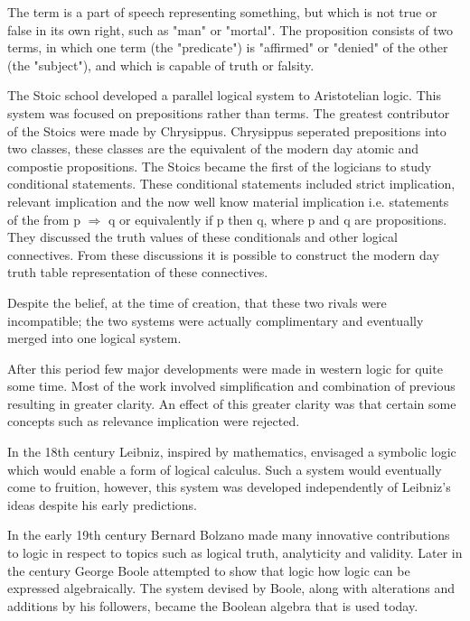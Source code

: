 The term is a part of speech representing something, but which is not true or false in its own right, such as "man" or "mortal".
The proposition consists of two terms, in which one term (the "predicate") is "affirmed" or "denied" of the other (the "subject"), and which is capable of truth or falsity.

The Stoic school developed a parallel logical system to Aristotelian logic. This system was focused on prepositions rather than terms. The greatest contributor of the Stoics were made by Chrysippus. Chrysippus seperated prepositions into two classes, these classes are the equivalent of the modern day atomic and compostie propositions. The Stoics became the first of the logicians to study conditional statements. These conditional statements included strict implication, relevant implication and the now well know material implication i.e. statements of the from p $\Rightarrow$ q or equivalently if p then q, where p and q are propositions. They discussed the truth values of these conditionals and other logical connectives. From these discussions it is possible to construct the modern day truth table representation of these connectives. 

Despite the belief, at the time of creation, that these two rivals were incompatible; the two systems were actually complimentary and eventually merged into one logical system.

After this period few major developments were made in western logic for quite some time. Most of the work involved simplification and combination of previous resulting in greater clarity. An effect of this greater clarity was that certain some concepts such as relevance implication were rejected. \cite{KingShapiro95} 





In the 18th century Leibniz, inspired by mathematics, envisaged a symbolic logic which would enable a form of logical calculus. Such a system would eventually come to fruition, however, this system was developed independently of Leibniz's ideas despite his early predictions. \cite{sep-leibniz-logic-influence}

In the early 19th century Bernard Bolzano made many innovative contributions to logic in respect to topics such as logical truth, analyticity and validity. Later in the century George Boole attempted to show that logic how logic can be expressed algebraically. The system devised by Boole, along with alterations and additions by his followers, became the Boolean algebra that is used today.

